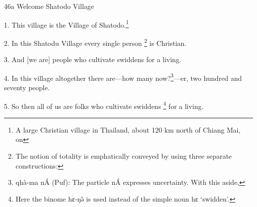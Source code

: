 
46a Welcome Shatodo Village

1. This village is the Village of Shatodo.\footnote{A large Christian village in Thailand, about 120 km north of Chiang Mai, on}

2. In this Shatodu Village every single person \footnote{The notion of totality is emphatically conveyed by using three separate constructions:} is Christian.

3. And [we are] people who cultivate swiddens for a living.

4. In this village altogether there are---how many now?\footnote{qhà-ma nÁ (Puf): The particle nÁ expresses uncertainty. With this aside,}---er, two hundred and
seventy people.

5. So then all of us are folks who cultivate swiddens \footnote{Here the binome hɛ-ŋə̂ is used instead of the simple noun hɛ `swidden'.} for a living.

